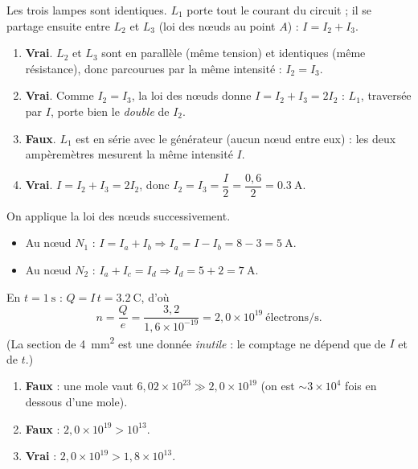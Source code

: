 \documentclass[11pt,a4paper]{article}
\begin{document}
\usetikzlibrary{babel}
\begin{corrige}
Les trois lampes sont identiques. $L_1$ porte tout le courant du circuit ; il se partage ensuite entre
$L_2$ et $L_3$ (loi des nœuds au point $A$) : $I=I_2+I_3$.
\begin{enumerate}[label=\alph*)]
  \item \textbf{Vrai}. $L_2$ et $L_3$ sont en parallèle (même tension) et identiques (même résistance),
        donc parcourues par la même intensité : $I_2=I_3$.
  \item \textbf{Vrai}. Comme $I_2=I_3$, la loi des nœuds donne $I=I_2+I_3=2I_2$ : $L_1$, traversée par
        $I$, porte bien le \emph{double} de $I_2$.
  \item \textbf{Faux}. $L_1$ est en série avec le générateur (aucun nœud entre eux) : les deux
        ampèremètres mesurent la même intensité $I$.
  \item \textbf{Vrai}. $I=I_2+I_3=2I_2$, donc $I_2=I_3=\dfrac{I}{2}=\dfrac{0{,}6}{2}=\qty{0.3}{\ampere}$.
\end{enumerate}
\end{corrige}

\begin{corrige}
On applique la loi des nœuds successivement.
\begin{itemize}[leftmargin=1.4em,topsep=2pt]
  \item Au nœud $N_1$ : $I=I_a+I_b \Rightarrow I_a=I-I_b=8-3=\qty{5}{\ampere}$.
  \item Au nœud $N_2$ : $I_a+I_c=I_d \Rightarrow I_d=5+2=\qty{7}{\ampere}$.
\end{itemize}
\end{corrige}

\begin{corrige}
En $t=\qty{1}{\second}$ : $Q=I\,t=\qty{3.2}{\coulomb}$, d'où
\[ n=\frac{Q}{e}=\frac{3{,}2}{1{,}6\times10^{-19}}=2{,}0\times10^{19}\ \text{électrons/s}. \]
(La section de \qty{4}{\milli\metre\squared} est une donnée \emph{inutile} : le comptage ne dépend que
de $I$ et de $t$.)
\begin{enumerate}[label=\alph*)]
  \item \textbf{Faux} : une mole vaut $6{,}02\times10^{23}\gg2{,}0\times10^{19}$ (on est $\sim3\times10^4$
        fois en dessous d'une mole).
  \item \textbf{Faux} : $2{,}0\times10^{19}>10^{13}$.
  \item \textbf{Vrai} : $2{,}0\times10^{19}>1{,}8\times10^{13}$.
\end{enumerate}
\end{corrige}
\end{document}
